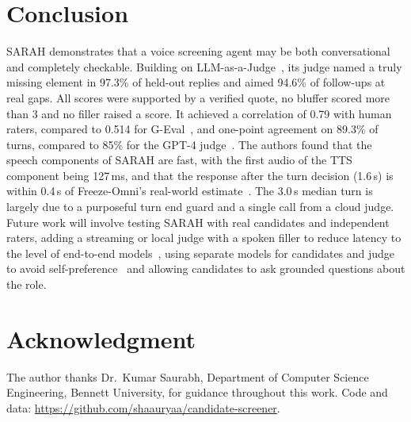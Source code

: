 \documentclass[conference]{IEEEtran}
\begin{document}
\section{Conclusion}\label{sec:conclusion}

SARAH demonstrates that a voice screening agent may be both conversational and completely checkable. Building on LLM-as-a-Judge~\cite{zheng2023}, its judge named a truly missing element in 97.3\% of held-out replies and aimed 94.6\% of follow-ups at real gaps. All scores were supported by a verified quote, no bluffer scored more than 3 and no filler raised a score. It achieved a correlation of 0.79 with human raters, compared to 0.514 for G-Eval~\cite{geval}, and one-point agreement on 89.3\% of turns, compared to 85\% for the GPT-4 judge~\cite{zheng2023}. The authors found that the speech components of SARAH are fast, with the first audio of the TTS component being 127\,ms, and that the response after the turn decision (1.6\,s) is within 0.4\,s of Freeze-Omni's real-world estimate~\cite{freezeomni}. The 3.0\,s median turn is largely due to a purposeful turn end guard and a single call from a cloud judge. Future work will involve testing SARAH with real candidates and independent raters, adding a streaming or local judge with a spoken filler to reduce latency to the level of end-to-end models~\cite{freezeomni,moshi}, using separate models for candidates and judge to avoid self-preference~\cite{panickssery2024} and allowing candidates to ask grounded questions about the role.


\section*{Acknowledgment}

The author thanks Dr.\ Kumar Saurabh, Department of Computer Science Engineering, Bennett University, for guidance throughout this work. Code and data: \url{https://github.com/shaauryaa/candidate-screener}.
\end{document}

